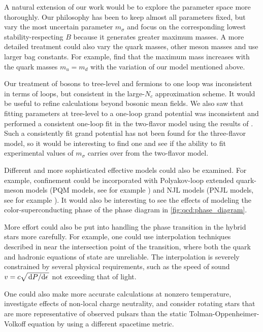 A natural extension of our work would be to
explore the parameter space more thoroughly.
Our philosophy has been to keep almost all parameters fixed,
but vary the most uncertain parameter $m_\sigma$ and focus on the corresponding lowest stability-respecting $B$
because it generates greater maximum masses.
A more detailed treatment could also vary the quark masses,
other meson masses and use larger bag constants.
For example, \cite{ref:lsm3f_compact_stars}
find that the maximum mass increases with the quark masses $m_u=m_d$
with the variation of our model mentioned above.

Our treatment of bosons to tree-level and fermions to one loop was inconsistent in terms of loops,
but consistent in the large-$N_c$ approximation scheme.
It would be useful to refine calculations beyond bosonic mean fields.
We also saw that fitting parameters at tree-level to a one-loop grand potential was inconsistent
and performed a consistent one-loop fit in the two-flavor model using the results of \cite{ref:jo_lsm_consistent_chiral,ref:jo_lsm_consistent_physical}.
Such a consistently fit grand potential has not been found for the three-flavor model,
so it would be interesting to find one and see if the ability to fit experimental values of $m_\sigma$ carries over from the two-flavor model.

Different and more sophisticated effective models could also be examined.
For example, confinement could be incorporated with Polyakov-loop extended quark-meson models (PQM models, see for example \cite{ref:pqm_2f,ref:pqm_3f,ref:master_folkestad}) and NJL models (PNJL models, see for example \cite{ref:pnjl_2f,ref:pnjl_3f,ref:pnjl_3f_zeroT}).
It would also be interesting to see the effects of modeling the color-superconducting phase of the phase diagram in \cref{fig:qcd:phase_diagram}.

More effort could also be put into handling the phase transition in the hybrid stars more carefully.
For example, one could use interpolation techniques described in \cite{ref:quark_star_review}
near the intersection point of the transition,
where both the quark and hadronic equations of state are unreliable.
The interpolation is severely constrained by several physical requirements,
such as the speed of sound $v = c \sqrt{\odv{P}/{\epsilon}}$ not exceeding that of light.

One could also make more accurate calculations at nonzero temperature,
investigate effects of non-local charge neutrality,
and consider rotating stars that are more representative of observed pulsars than the static Tolman-Oppenheimer-Volkoff equation by using a different spacetime metric.
